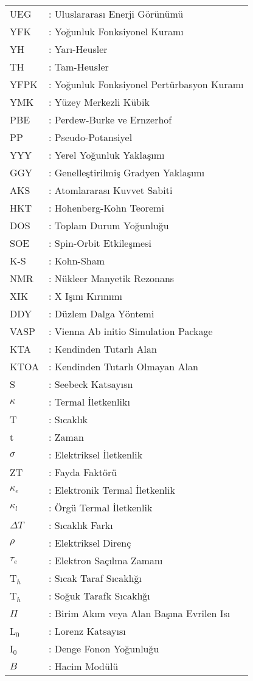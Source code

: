 \hspace{-3mm}
\begin{tabular}{p{2cm}l}
{ {UEG}} & { :} Uluslararası Enerji Görünümü\\
{  YFK} & { :} Yoğunluk Fonksiyonel Kuramı\\
{  YH} & { :} Yarı-Heusler\\
{  TH} & { :} Tam-Heusler\\
{  YFPK} & { :} Yoğunluk Fonksiyonel Pertürbasyon Kuramı\\
{  YMK} & { :} Yüzey Merkezli Kübik\\
{  PBE} & { :} Perdew-Burke ve Ernzerhof\\
{  PP} & { :} Pseudo-Potansiyel\\
{  YYY} & { :} Yerel Yoğunluk Yaklaşımı\\
{  GGY} & { :} Genelleştirilmiş Gradyen Yaklaşımı\\
{  AKS} & { :} Atomlararası Kuvvet Sabiti\\
{  HKT} & { :} Hohenberg-Kohn Teoremi\\
{  DOS} & { :} Toplam Durum Yoğunluğu\\
{  SOE} & { :} Spin-Orbit Etkileşmesi\\
{  K-S} & { :} Kohn-Sham\\
{  NMR} & { :} Nükleer Manyetik Rezonans\\
{  XIK} & { :} X Işını Kırınımı\\
{  DDY} & { :} Düzlem Dalga Yöntemi\\
{  VASP} & { :} Vienna Ab initio Simulation Package\\
{  KTA} & { :} Kendinden Tutarlı Alan\\
{  KTOA} & { :} Kendinden Tutarlı Olmayan Alan\\
{  {S}} & {  :} Seebeck Katsayısı\i\\
{   $\kappa$} & {  :} Termal İletkenlik\i\\
{   T} & {  :} Sıcaklık\\
{   t} & {  :} Zaman\\
{   $\sigma$} & {  :} Elektriksel İletkenlik\\
{   ZT} & {  :} Fayda Faktörü\\
{   $\kappa_e$} & {  :} Elektronik Termal İletkenlik\\
{   $\kappa_l$} & {  :} Örgü Termal İletkenlik\\
{   $\Delta T$} & {  :} Sıcaklık Farkı\\
{   $\rho$ } & {  :} Elektriksel Direnç\\
{    $\tau_e$} & {  :} Elektron Saçılma Zamanı\\
{    T$_h$} & {  :} Sıcak Taraf Sıcaklığı\\
{    T$_h$} & {  :} Soğuk Tarafk Sıcaklığı\\
{    $\Pi$} & {  :} Birim Akım veya Alan Başına Evrilen Isı\\
{    L$_0$} & {  :} Lorenz Katsayısı\\
{    I$_0$} & {  :} Denge Fonon Yoğunluğu\\
{    $B$} & {  :} Hacim Modülü\\
\end{tabular}
